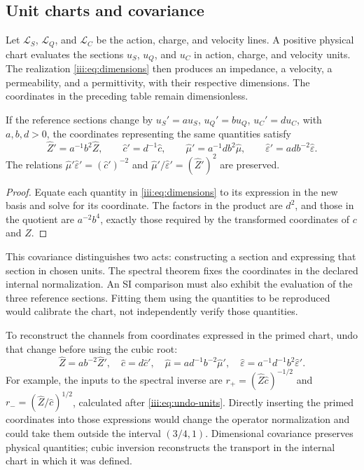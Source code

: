 \subsection{Unit charts and covariance}

Let $\mathcal L_S$, $\mathcal L_Q$, and $\mathcal L_C$ be the action,
charge, and velocity lines. A positive physical chart evaluates the sections
$u_S$, $u_Q$, and $u_C$ in action, charge, and velocity units. The realization
\eqref{iii:eq:dimensions} then produces an impedance, a velocity,
a permeability, and a permittivity, with their respective dimensions.
The coordinates in the preceding table remain dimensionless.

\begin{proposition}
If the reference sections change by
$u_S'=a u_S$, $u_Q'=b u_Q$, $u_C'=d u_C$, with $a,b,d>0$, the
coordinates representing the same quantities satisfy
\[
 \widehat Z'=a^{-1}b^2\widehat Z,\qquad
 \widehat c'=d^{-1}\widehat c,\qquad
 \widehat\mu'=a^{-1}db^2\widehat\mu,\qquad
 \widehat\varepsilon'=adb^{-2}\widehat\varepsilon.
\]
The relations $\widehat\mu'\widehat\varepsilon'=(\widehat c')^{-2}$
and $\widehat\mu'/\widehat\varepsilon'=(\widehat Z')^2$ are preserved.
\end{proposition}
\begin{proof}
Equate each quantity in \eqref{iii:eq:dimensions} to its expression
in the new basis and solve for its coordinate. The factors in the product
are $d^2$, and those in the quotient are $a^{-2}b^4$, exactly those required
by the transformed coordinates of $c$ and $Z$.
\end{proof}

This covariance distinguishes two acts: constructing a section and expressing
that section in chosen units. The spectral theorem fixes the coordinates
in the declared internal normalization. An SI comparison must also exhibit
the evaluation of the three reference sections. Fitting them
using the quantities to be reproduced would calibrate
the chart, not independently verify those quantities.

To reconstruct the channels from coordinates expressed in the primed
chart, undo that change before using the cubic root:
\begin{equation}
 \widehat Z=ab^{-2}\widehat Z',\quad
 \widehat c=d\widehat c',\quad
 \widehat\mu=ad^{-1}b^{-2}\widehat\mu',\quad
 \widehat\varepsilon=a^{-1}d^{-1}b^2\widehat\varepsilon'.
 \label{iii:eq:undo-units}
\end{equation}
For example, the inputs to the spectral inverse are
$r_+=(\widehat Z\widehat c)^{-1/2}$ and
$r_-=(\widehat Z/\widehat c)^{1/2}$, calculated after
\eqref{iii:eq:undo-units}. Directly inserting the primed coordinates
into those expressions would change the operator normalization and could
take them outside the interval $(3/4,1)$. Dimensional covariance preserves
physical quantities; cubic inversion reconstructs the transport
in the internal chart in which it was defined.

